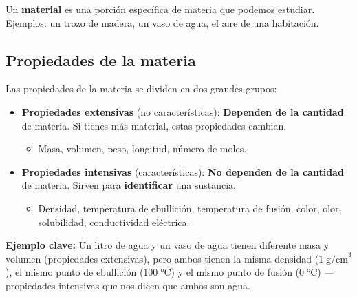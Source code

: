 \documentclass[12pt, a4paper]{article}
\begin{document}
Un \textbf{material} es una porción específica de materia que podemos estudiar. Ejemplos: un trozo de madera, un vaso de agua, el aire de una habitación.

\subsection{Propiedades de la materia}

Las propiedades de la materia se dividen en dos grandes grupos:

\begin{cuadrosolucion}
\begin{itemize}[leftmargin=*]
  \item \textbf{Propiedades extensivas} (no características): \textbf{Dependen de la cantidad} de materia. Si tienes más material, estas propiedades cambian.
  \begin{itemize}
    \item Masa, volumen, peso, longitud, número de moles.
  \end{itemize}
  
  \item \textbf{Propiedades intensivas} (características): \textbf{No dependen de la cantidad} de materia. Sirven para \textbf{identificar} una sustancia.
  \begin{itemize}
    \item Densidad, temperatura de ebullición, temperatura de fusión, color, olor, solubilidad, conductividad eléctrica.
  \end{itemize}
\end{itemize}
\end{cuadrosolucion}

\begin{cuadroadvertencia}
\textbf{Ejemplo clave:} Un litro de agua y un vaso de agua tienen diferente masa y volumen (propiedades extensivas), pero ambos tienen la misma densidad ($1\;\text{g/cm}^3$), el mismo punto de ebullición ($100\;°\text{C}$) y el mismo punto de fusión ($0\;°\text{C}$) — propiedades intensivas que nos dicen que ambos son agua.
\end{cuadroadvertencia}
\end{document}
